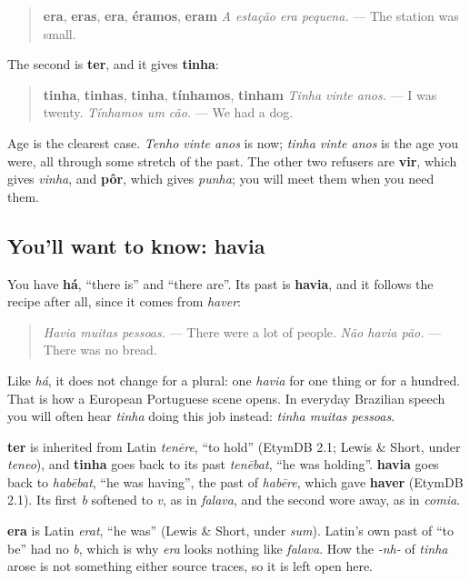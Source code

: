 \begin{quote}
\textbf{era}, \textbf{eras}, \textbf{era}, \textbf{éramos}, \textbf{eram} \emph{A estação era pequena.} — The station was small.
\end{quote}

The second is \textbf{ter}, and it gives \textbf{tinha}:

\begin{quote}
\textbf{tinha}, \textbf{tinhas}, \textbf{tinha}, \textbf{tínhamos}, \textbf{tinham} \emph{Tinha vinte anos.} — I was twenty. \emph{Tínhamos um cão.} — We had a dog.
\end{quote}

Age is the clearest case. \emph{Tenho vinte anos} is now; \emph{tinha vinte anos} is the age you were, all through some stretch of the past. The other two refusers are \textbf{vir}, which gives \emph{vinha}, and \textbf{pôr}, which gives \emph{punha}; you will meet them when you need them.

\subsection*{You'll want to know: havia}
You have \textbf{há}, \textquotedblleft{}there is\textquotedblright{} and \textquotedblleft{}there are\textquotedblright{}. Its past is \textbf{havia}, and it follows the recipe after all, since it comes from \emph{haver}:

\begin{quote}
\emph{Havia muitas pessoas.} — There were a lot of people. \emph{Não havia pão.} — There was no bread.
\end{quote}

Like \emph{há}, it does not change for a plural: one \emph{havia} for one thing or for a hundred. That is how a European Portuguese scene opens. In everyday Brazilian speech you will often hear \emph{tinha} doing this job instead: \emph{tinha muitas pessoas}.

\begin{cousinweb}
\textbf{ter} is inherited from Latin \emph{tenēre}, \textquotedblleft{}to hold\textquotedblright{} (EtymDB 2.1; Lewis \& Short, under \emph{teneo}), and \textbf{tinha} goes back to its past \emph{tenēbat}, \textquotedblleft{}he was holding\textquotedblright{}. \textbf{havia} goes back to \emph{habēbat}, \textquotedblleft{}he was having\textquotedblright{}, the past of \emph{habēre}, which gave \textbf{haver} (EtymDB 2.1). Its first \emph{b} softened to \emph{v}, as in \emph{falava}, and the second wore away, as in \emph{comia}.

\textbf{era} is Latin \emph{erat}, \textquotedblleft{}he was\textquotedblright{} (Lewis \& Short, under \emph{sum}). Latin's own past of \textquotedblleft{}to be\textquotedblright{} had no \emph{b}, which is why \emph{era} looks nothing like \emph{falava}. How the \emph{-nh-} of \emph{tinha} arose is not something either source traces, so it is left open here.
\end{cousinweb}

